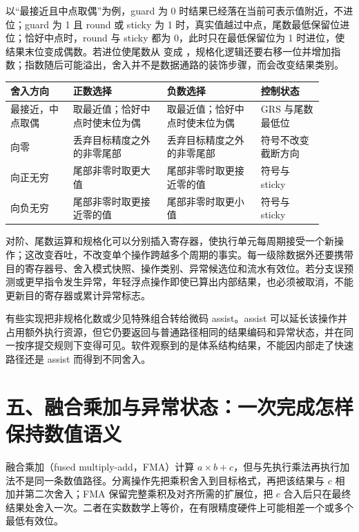 以“最接近且中点取偶”为例，guard 为 0 时结果已经落在当前可表示值附近，不进位；guard 为 1 且 round 或 sticky 为 1 时，真实值越过中点，尾数最低保留位进位；恰好中点时，round 与 sticky 都为 0，此时只在最低保留位为 1 时进位，使结果末位变成偶数。若进位使尾数从  变成 ，规格化逻辑还要右移一位并增加指数；指数随后可能溢出，舍入并不是数据通路的装饰步骤，而会改变结果类别。

\begin{longtable}{L{0.18\linewidth}L{0.27\linewidth}L{0.27\linewidth}L{0.18\linewidth}}
\toprule
舍入方向 & 正数选择 & 负数选择 & 控制状态 \\
\midrule
最接近，中点取偶 & 取最近值；恰好中点时使末位为偶 & 取最近值；恰好中点时使末位为偶 & GRS 与尾数最低位 \\\tablerowrule
向零 & 丢弃目标精度之外的非零尾部 & 丢弃目标精度之外的非零尾部 & 符号不改变截断方向 \\\tablerowrule
向正无穷 & 尾部非零时取更大值 & 尾部非零时取更接近零的值 & 符号与 sticky \\\tablerowrule
向负无穷 & 尾部非零时取更接近零的值 & 尾部非零时取更小值 & 符号与 sticky \\
\bottomrule
\end{longtable}


对阶、尾数运算和规格化可以分别插入寄存器，使执行单元每周期接受一个新操作；这改变吞吐，不改变单个操作跨越多个周期的事实。每一级除数据外还要携带目的寄存器号、舍入模式快照、操作类别、异常候选位和流水有效位。若分支误预测或更早指令发生异常，年轻浮点操作即使已算出内部结果，也必须被取消，不能更新目的寄存器或累计异常标志。

有些实现把非规格化数或少见特殊组合转给微码 assist。assist 可以延长该操作并占用额外执行资源，但它仍要返回与普通路径相同的结果编码和异常状态，并在同一按序提交规则下变得可见。软件观察到的是体系结构结果，不能因内部走了快速路径还是 assist 而得到不同舍入。

\section{五、融合乘加与异常状态：一次完成怎样保持数值语义}

融合乘加（fused multiply-add，FMA）计算 \(a\times b+c\)，但与先执行乘法再执行加法不是同一条数值路径。分离操作先把乘积舍入到目标格式，再把该结果与 \(c\) 相加并第二次舍入；FMA 保留完整乘积及对齐所需的扩展位，把 \(c\) 合入后只在最终结果处舍入一次。二者在实数数学上等价，在有限精度硬件上可能相差一个或多个最低有效位。

